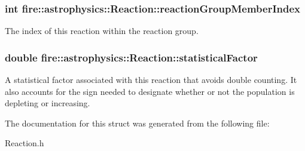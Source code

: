 \subsubsection[{\texorpdfstring{reaction\+Group\+Member\+Index}{reactionGroupMemberIndex}}]{\setlength{\rightskip}{0pt plus 5cm}int fire\+::astrophysics\+::\+Reaction\+::reaction\+Group\+Member\+Index}\hypertarget{a00242_adb666fe2c511b5a5e86ebcd35ba7faa4}{}\label{a00242_adb666fe2c511b5a5e86ebcd35ba7faa4}
The index of this reaction within the reaction group. 
\subsubsection[{\texorpdfstring{statistical\+Factor}{statisticalFactor}}]{\setlength{\rightskip}{0pt plus 5cm}double fire\+::astrophysics\+::\+Reaction\+::statistical\+Factor}\hypertarget{a00242_a439daff55fecd97cafc96f204570376a}{}\label{a00242_a439daff55fecd97cafc96f204570376a}
A statistical factor associated with this reaction that avoids double counting. It also accounts for the sign needed to designate whether or not the population is depleting or increasing. 

The documentation for this struct was generated from the following file\+:\begin{DoxyCompactItemize}
\item 
Reaction.\+h\end{DoxyCompactItemize}
